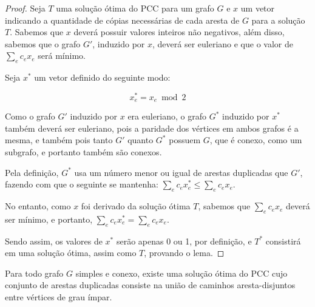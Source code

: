 \begin{proof}
    Seja $T$ uma solução ótima do PCC para um grafo $G$ e $x$ um vetor indicando a quantidade de cópias necessárias de cada aresta de $G$ para a solução $T$. 
    Sabemos que $x$ deverá possuir valores inteiros não negativos, além disso, sabemos que o grafo $G'$, induzido por $x$, deverá ser euleriano e que o valor de $\sum_e c_ex_e$ será mínimo.

    Seja $x^*$ um vetor definido do seguinte modo:

    \[  x^*_e = x_e \bmod 2    \]

    Como o grafo $G'$ induzido por $x$ era euleriano, o grafo $G^*$ induzido por $x^*$ também deverá ser euleriano, pois a paridade dos vértices em ambos grafos é a mesma, e também pois tanto $G'$ quanto $G^*$ possuem $G$, que é conexo, como um subgrafo, e portanto também são conexos.
    
    Pela definição, $G^*$ usa um número menor ou igual de arestas duplicadas que $G'$, fazendo com que o seguinte se mantenha: $\sum_e c_ex^*_e \leq \sum_e c_ex_e$.

    No entanto, como $x$ foi derivado da solução ótima $T$, sabemos que $\sum_e c_ex_e$ deverá ser mínimo, e portanto, $\sum_e c_ex^*_e = \sum_e c_ex_e$. 

    Sendo assim, os valores de $x^*$ serão apenas 0 ou 1, por definição, e $T^*$ consistirá em uma solução ótima, assim como $T$, provando o lema.

\end{proof}

\begin{lemma}
    Para todo grafo $G$ simples e conexo, existe uma solução ótima do PCC cujo conjunto de arestas duplicadas consiste na união de caminhos aresta-disjuntos entre vértices de grau ímpar.
\end{lemma}

